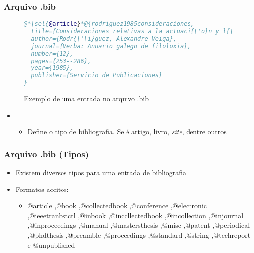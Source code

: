 \begin{frame}[fragile] \frametitle{Arquivo .bib}
\vspace{-0.5cm}
\begin{figure}[!t]
\caption{Exemplo de uma entrada no arquivo .bib}
\begin{lstlisting}[language=BibTeX]
@*\sel{@article}*@{rodriguez1985consideraciones,
  title={Consideraciones relativas a la actuaci{\'o}n y l{\'\i}mites de las oposiciones fonol{\'o}gicas interrupto/continuo y tenso/flojo en espa{\~n}ol},
  author={Rodr{\'\i}guez, Alexandre Veiga},
  journal={Verba: Anuario galego de filoloxia},
  number={12},
  pages={253--286},
  year={1985},
  publisher={Servicio de Publicaciones}
}
\end{lstlisting}
\ownsrc
\end{figure}

\begin{itemize}
	\item {}
	\begin{itemize}
		\item Define o tipo de bibliografia. Se é artigo, livro, \textit{site}, dentre outros
	\end{itemize}
\end{itemize}
\end{frame}

\begin{frame}[fragile] \frametitle{Arquivo .bib (Tipos)}

\begin{itemize}
	\item Existem diversos tipos para uma entrada de bibliografia
	\item Formatos aceitos: 
	\begin{itemize}
		\item @article ,@book ,@collectedbook ,@conference ,@electronic ,@ieeetranbstctl ,@inbook ,@incollectedbook ,@incollection ,@injournal ,@inproceedings ,@manual ,@mastersthesis ,@misc ,@patent ,@periodical ,@phdthesis ,@preamble ,@proceedings ,@standard ,@string ,@techreport e @unpublished
	\end{itemize}
\end{itemize}

\end{frame}


